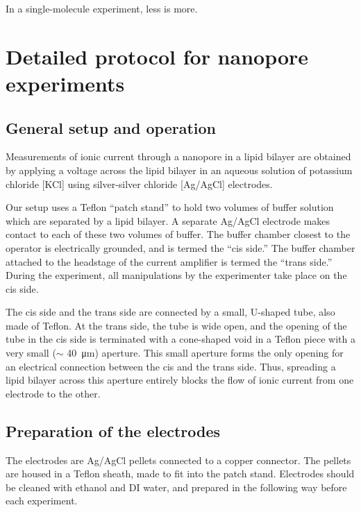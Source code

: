 \begin{savequote}[75mm]
In a single-molecule experiment, less is more.
\end{savequote}

\chapter{Detailed protocol for nanopore experiments}
\label{protocol}

\section{General setup and operation}

Measurements of ionic current through a nanopore in a lipid bilayer are obtained by applying a voltage across the lipid bilayer in an aqueous solution of potassium chloride [KCl] using silver-silver chloride [Ag/AgCl] electrodes.

Our setup uses a Teflon “patch stand” to hold two volumes of buffer solution which are separated by a lipid bilayer.  A separate Ag/AgCl electrode makes contact to each of these two volumes of buffer.  The buffer chamber closest to the operator is electrically grounded, and is termed the “cis side.”  The buffer chamber attached to the headstage of the current amplifier is termed the “trans side.”  During the experiment, all manipulations by the experimenter take place on the cis side.

The cis side and the trans side are connected by a small, U-shaped tube, also made of Teflon.  At the trans side, the tube is wide open, and the opening of the tube in the cis side is terminated with a cone-shaped void in a Teflon piece with a very small ($\sim$ \SI{40}{\micro\m}) aperture.  This small aperture forms the only opening for an electrical connection between the cis and the trans side.  Thus, spreading a lipid bilayer across this aperture entirely blocks the flow of ionic current from one electrode to the other.

\section{Preparation of the electrodes}

The electrodes are Ag/AgCl pellets connected to a copper connector.  The pellets are housed in a Teflon sheath, made to fit into the patch stand.  Electrodes should be cleaned with ethanol and DI water, and prepared in the following way before each experiment.

